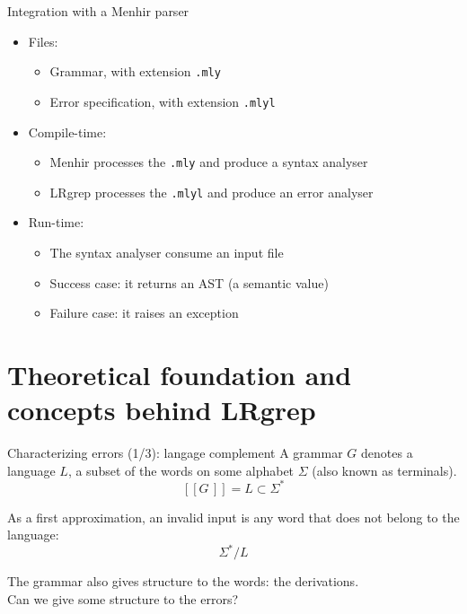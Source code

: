 \documentclass[aspectratio=169]{beamer}          %
\begin{document}
\begin{frame}{Integration with a Menhir parser}

  \begin{itemize}
    \item Files:
      \begin{itemize}
      \item Grammar, with extension \texttt{.mly}
      \item<2-> Error specification, with extension \texttt{.mlyl}
      \end{itemize}
    \item Compile-time:
      \begin{itemize}
        \item Menhir processes the \texttt{.mly} and produce a syntax analyser
        \item<2-> LRgrep processes the \texttt{.mlyl} and produce an error analyser
      \end{itemize}
    \item Run-time:
      \begin{itemize}
        \item The syntax analyser consume an input file
        \item Success case: it returns an AST (a semantic value)
        \item Failure case: it raises an exception \\
      \end{itemize}
  \end{itemize}

\end{frame}

\section{Theoretical foundation and concepts behind LRgrep}

\begin{frame}{Characterizing errors (1/3): langage complement}
  A grammar $G$ denotes a language $L$, a subset of the words on some alphabet $\Sigma$ (also known as terminals).
  $$
  [\![G\,]\!] = L \subset \Sigma^*
  $$

  \pause
  As a first approximation, an invalid input is any word that does not belong to the language:
  $$
  \Sigma^* / L
  $$

  \pause
  The grammar also gives structure to the words: the derivations.
  \\
  Can we give some structure to the errors?
\end{frame}
\end{document}
